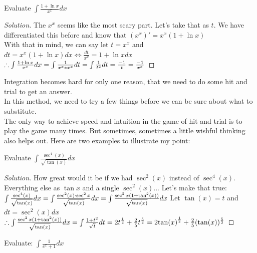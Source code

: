 \begin{example}
    Evaluate $\int \frac{1+\ln{x}}{x^x} dx$
\end{example}
\begin{proof}
    [Solution]
    The $x^x$ seems like the most scary part. Let's take that as $t$. We have differentiated this before and know that $(x^x)'=x^x(1+\ln{x})$\\
    With that in mind, we can say let $t=x^x$ and $dt=x^x(1+\ln{x})dx \iff \frac{dt}{x^x}=1+\ln{x} dx$\\
    $ \therefore \int \frac{1+\ln{x}}{x^x} dx\\
    = \int \frac{1}{x^x*x^x} dt\\
    =  \int \frac{1}{t^2} dt\\
    = \frac{-1}{t}\\
    = \frac{-1}{x^x} $
\end{proof}
Integration becomes hard for only one reason, that we need to do some hit and trial to get an answer.\\
In this method, we need to try a few things before we can be sure about what to substitute.\\
The only way to achieve speed and intuition in the game of hit and trial is to play the game many times. But sometimes, sometimes a little wishful thinking also helps out. Here are two examples to illustrate my point:\\
\begin{example}
    Evaluate $\int \frac{\sec^4(x)}{\sqrt{\tan(x)}} dx$
\end{example}
\begin{proof}
    [Solution]
    How great would it be if we had $\sec^2(x)$ instead of $\sec^4(x)$. Everything else as $\tan{x}$ and a single $\sec^2(x)$... Let's make that true:\\
    $
    \int \frac{\sec^4(x)}{\sqrt{\tan(x)}} dx\\
    =\int \frac{\sec^2(x) \cdot \sec^2{x}}{\sqrt{\tan(x)}} dx\\
    = \int \frac{\sec^2{x}(1+\tan^2(x))}{\sqrt{\tan(x)}} dx$
    Let $\tan(x)=t$ and $dt=\sec^2(x)dx$\\
    $
    \therefore \int \frac{\sec^2{x}(1+\tan^2(x))}{\sqrt{\tan(x)}} dx\\
    = \int \frac{1+t^2}{\sqrt{t}} dt\\
    = 2t^{\frac{1}{2}}+\frac{2}{5}t^{\frac{5}{2}}
    = 2{\tan(x)}^{\frac{1}{2}}+\frac{2}{5}(\tan(x))^{\frac{5}{2}}
    $
\end{proof}
\begin{example}
    Evaluate: $\int \frac{1}{e^x+1}dx$
\end{example}

